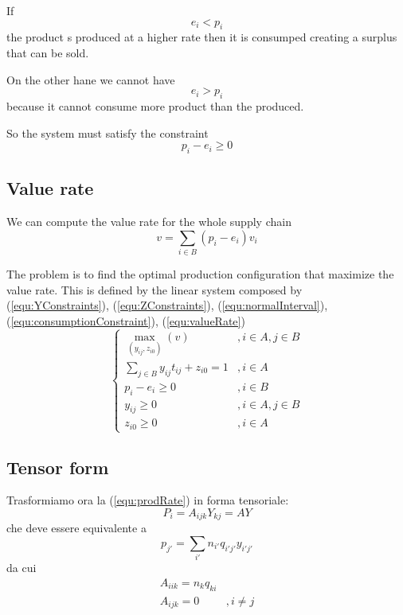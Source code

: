 \documentclass[a4paper,11pt]{article}
\begin{document}
If
	\[ e_i < p_i \]
the product s produced at a higher rate then it is consumped creating a surplus that can be sold.

On the other hane we cannot have 
	\[ e_i > p_i \]
because it cannot consume more product than the produced.

So the system must satisfy the constraint
\begin{equation}
\label{equ:consumptionConstraint}
	p_i - e_i \ge 0
\end{equation}
	
\subsection{Value rate}
We can compute the value rate for the whole supply chain
\begin{equation}
\label{equ:valueRate}
	v = \sum_{i \in B}( p_i - e_i ) v_i
\end{equation}

The problem is to find the optimal production configuration that maximize the value rate. This is defined by the linear system composed by
(\ref{equ:YConstraints}),
(\ref{equ:ZConstraints}),
(\ref{equ:normalInterval}),
(\ref{equ:consumptionConstraint}),
(\ref{equ:valueRate})
\[
\left\{
\begin{array}{ll}
	\max_{(y_{ij}, z_{i0})} (v) & , i \in A, j \in B \\
	\sum_{j \in B} y_{ij} t_{ij} + z_{i0} = 1 & , i \in A \\
	p_i - e_i \ge 0 & , i \in B \\
	y_{ij} \ge 0 & , i \in A, j \in B \\
	z_{i0} \ge 0 & , i \in A
\end{array}
\right.
\]

\subsection{Tensor form}

Trasformiamo ora la (\ref{equ:prodRate}) in forma tensoriale:
\[
	P_i = A_{ijk} Y_{kj} = A Y
\]
che deve essere equivalente a
\begin{equation}
\label{equ:p_j}
	p_{j'} = \sum_{i'} n_{i'} q_{i'j'} y_{i'j'}
\end{equation}
da cui
\begin{equation}
\label{equ:Aijk}
\begin{array}{ll}
	A_{iik} = n_k q_{ki} \\
	A_{ijk} = 0 &, i \ne j
\end{array}
\end{equation}
\end{document}
